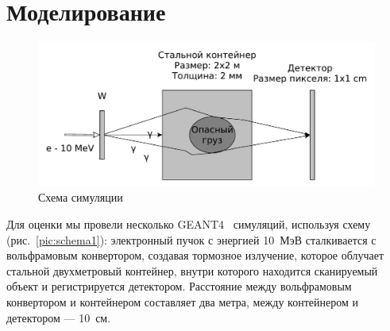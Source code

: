 \documentclass[a4paper]{panl}
\begin{document}
\section*{Моделирование}
\begin{figure}[t]
    \begin{center}
        \includegraphics[width=120mm]{yed_schema_1.pdf}
        \vspace{-3mm}
        \caption{Схема симуляции}
    \end{center}
    \vspace{-5mm}
\end{figure}
Для оценки мы провели несколько GEANT4~\cite{ALLISON2016186} симуляций, используя схему (рис.~\ref{pic:schema1}): электронный пучок с энергией 10~МэВ сталкивается с вольфрамовым конвертором, создавая тормозное излучение, которое облучает стальной двухметровый контейнер, внутри которого находится сканируемый объект и регистрируется детектором. Расстояние между вольфрамовым конвертором и контейнером составляет два метра, между контейнером и детектором --- 10~см.
\end{document}
